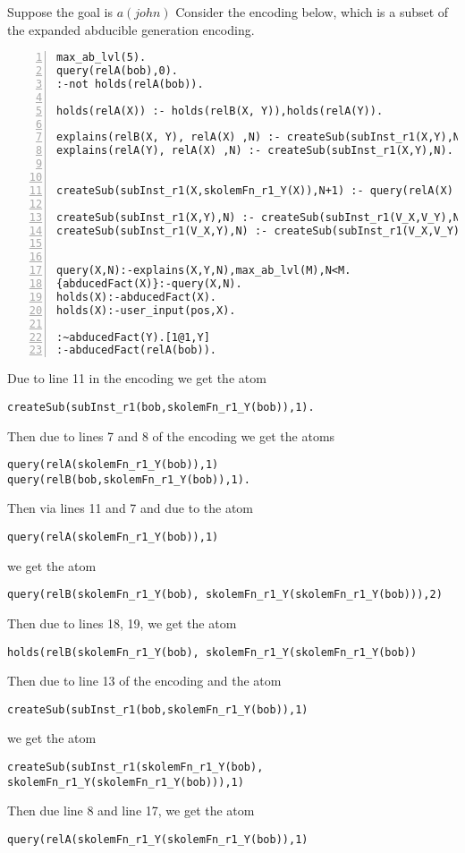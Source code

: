 Suppose the goal is $a(john)$
Consider the encoding below, which is a subset of the expanded abducible generation encoding.
\begin{lstlisting}[numbers=left]
max_ab_lvl(5).
query(relA(bob),0).
:-not holds(relA(bob)).

holds(relA(X)) :- holds(relB(X, Y)),holds(relA(Y)).

explains(relB(X, Y), relA(X) ,N) :- createSub(subInst_r1(X,Y),N).
explains(relA(Y), relA(X) ,N) :- createSub(subInst_r1(X,Y),N).


createSub(subInst_r1(X,skolemFn_r1_Y(X)),N+1) :- query(relA(X) ,N),max_ab_lvl(M),N<M-1.

createSub(subInst_r1(X,Y),N) :- createSub(subInst_r1(V_X,V_Y),N), holds(relB(X, Y)).
createSub(subInst_r1(V_X,Y),N) :- createSub(subInst_r1(V_X,V_Y),N),holds(relA(Y)).


query(X,N):-explains(X,Y,N),max_ab_lvl(M),N<M.
{abducedFact(X)}:-query(X,N).
holds(X):-abducedFact(X).
holds(X):-user_input(pos,X).

:~abducedFact(Y).[1@1,Y]
:-abducedFact(relA(bob)).
\end{lstlisting}

Due to line 11 in the encoding we get the atom\begin{lstlisting}[frame=none]
createSub(subInst_r1(bob,skolemFn_r1_Y(bob)),1).
\end{lstlisting}
Then due to lines 7 and 8 of the encoding we get the atoms \begin{lstlisting}[frame=none]
query(relA(skolemFn_r1_Y(bob)),1) query(relB(bob,skolemFn_r1_Y(bob)),1).
\end{lstlisting} 

Then via lines 11 and 7 and due to the atom
\begin{lstlisting}[frame=none]
query(relA(skolemFn_r1_Y(bob)),1)
\end{lstlisting} we get the atom \begin{lstlisting}[frame=none]
query(relB(skolemFn_r1_Y(bob), skolemFn_r1_Y(skolemFn_r1_Y(bob))),2)
\end{lstlisting} 
Then due to lines 18, 19, we get the atom \begin{lstlisting}[frame=none]
holds(relB(skolemFn_r1_Y(bob), skolemFn_r1_Y(skolemFn_r1_Y(bob))
\end{lstlisting}
Then due to line 13 of the encoding and the atom \begin{lstlisting}[frame=none]
createSub(subInst_r1(bob,skolemFn_r1_Y(bob)),1)
\end{lstlisting} we get the atom
\begin{lstlisting}[frame=none]
createSub(subInst_r1(skolemFn_r1_Y(bob), skolemFn_r1_Y(skolemFn_r1_Y(bob))),1)
\end{lstlisting}
Then due line 8 and line 17, we get the atom \begin{lstlisting}[frame=none]
query(relA(skolemFn_r1_Y(skolemFn_r1_Y(bob)),1)
\end{lstlisting}

